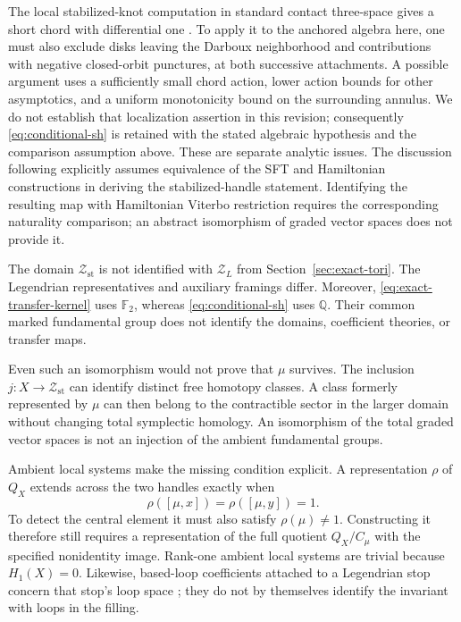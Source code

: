 \documentclass[11pt]{amsart}
\theoremstyle{definition}
\theoremstyle{remark}
\newcommand{\Q}{\mathbb Q}
\newcommand{\Ftwo}{\mathbb F_2}
\begin{document}
The local stabilized-knot computation in standard contact
three-space gives a short chord with differential one
\cite[Proposition 3.12]{EN20}. To apply it to the anchored algebra
here, one must also exclude disks leaving the Darboux neighborhood
and contributions with negative closed-orbit punctures, at both
successive attachments. A possible argument uses a sufficiently
small chord action, lower action bounds for other asymptotics, and
a uniform monotonicity bound on the surrounding annulus. We do not
establish that localization assertion in this revision; consequently
\eqref{eq:conditional-sh} is retained with the stated algebraic
hypothesis and the comparison assumption above. These are separate
analytic issues. The discussion following
\cite[Theorem 6.13]{Sei13} explicitly assumes equivalence of the
SFT and Hamiltonian constructions in deriving the stabilized-handle
statement. Identifying the resulting map with Hamiltonian Viterbo
restriction requires the corresponding naturality comparison;
an abstract isomorphism of graded vector spaces does not provide it.

The domain $\mathcal Z_{\mathrm{st}}$ is not identified with
$\mathcal Z_L$ from Section~\ref{sec:exact-tori}. The Legendrian
representatives and auxiliary framings differ. Moreover,
\eqref{eq:exact-transfer-kernel} uses $\Ftwo$, whereas
\eqref{eq:conditional-sh} uses $\Q$. Their common marked
fundamental group does not identify the domains, coefficient
theories, or transfer maps.

Even such an isomorphism would not prove that $\mu$ survives.
The inclusion $j:X\to\mathcal Z_{\mathrm{st}}$ can identify
distinct free homotopy classes. A class formerly represented by
$\mu$ can then belong to the contractible sector in the larger
domain without changing total symplectic homology. An isomorphism
of the total graded vector spaces is not an injection of the
ambient fundamental groups.

Ambient local systems make the missing condition explicit. A
representation $\rho$ of $Q_X$ extends across the two handles
exactly when
\[
 \rho([\mu,x])=\rho([\mu,y])=1.
\]
To detect the central element it must also satisfy
$\rho(\mu)\ne1$. Constructing it therefore still requires a
representation of the full quotient $Q_X/C_\mu$ with the specified
nonidentity image. Rank-one ambient local systems are trivial
because $H_1(X)=0$. Likewise, based-loop coefficients attached to
a Legendrian stop concern that stop's loop space
\cite[Section 4.5]{Ekh24}; they do not by themselves identify
the invariant with loops in the filling.
\end{document}
